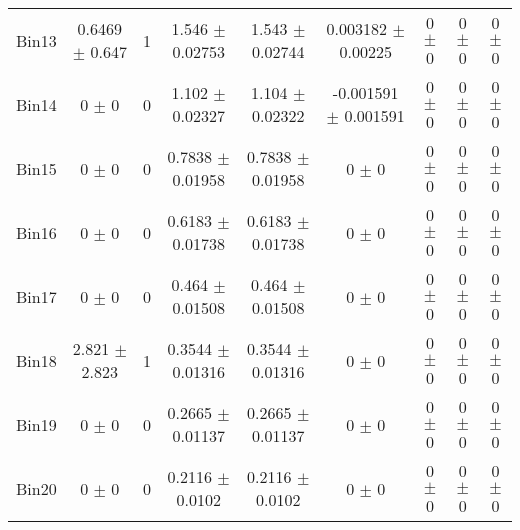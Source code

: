 \begin{tabular}{@{\extracolsep{4pt}}lcccccccc@{}}
     Bin13 & 0.6469 $\pm$ 0.647 & 1 & 1.546 $\pm$ 0.02753 & 1.543 $\pm$ 0.02744 & 0.003182 $\pm$ 0.00225 & 0 $\pm$ 0 & 0 $\pm$ 0 & 0 $\pm$ 0 \\ 
     Bin14 & 0 $\pm$ 0 & 0 & 1.102 $\pm$ 0.02327 & 1.104 $\pm$ 0.02322 & -0.001591 $\pm$ 0.001591 & 0 $\pm$ 0 & 0 $\pm$ 0 & 0 $\pm$ 0 \\ 
     Bin15 & 0 $\pm$ 0 & 0 & 0.7838 $\pm$ 0.01958 & 0.7838 $\pm$ 0.01958 & 0 $\pm$ 0 & 0 $\pm$ 0 & 0 $\pm$ 0 & 0 $\pm$ 0 \\ 
     Bin16 & 0 $\pm$ 0 & 0 & 0.6183 $\pm$ 0.01738 & 0.6183 $\pm$ 0.01738 & 0 $\pm$ 0 & 0 $\pm$ 0 & 0 $\pm$ 0 & 0 $\pm$ 0 \\ 
     Bin17 & 0 $\pm$ 0 & 0 & 0.464 $\pm$ 0.01508 & 0.464 $\pm$ 0.01508 & 0 $\pm$ 0 & 0 $\pm$ 0 & 0 $\pm$ 0 & 0 $\pm$ 0 \\ 
     Bin18 & 2.821 $\pm$ 2.823 & 1 & 0.3544 $\pm$ 0.01316 & 0.3544 $\pm$ 0.01316 & 0 $\pm$ 0 & 0 $\pm$ 0 & 0 $\pm$ 0 & 0 $\pm$ 0 \\ 
     Bin19 & 0 $\pm$ 0 & 0 & 0.2665 $\pm$ 0.01137 & 0.2665 $\pm$ 0.01137 & 0 $\pm$ 0 & 0 $\pm$ 0 & 0 $\pm$ 0 & 0 $\pm$ 0 \\ 
     Bin20 & 0 $\pm$ 0 & 0 & 0.2116 $\pm$ 0.0102 & 0.2116 $\pm$ 0.0102 & 0 $\pm$ 0 & 0 $\pm$ 0 & 0 $\pm$ 0 & 0 $\pm$ 0 \\ 
\hline\hline
  \end{tabular}
